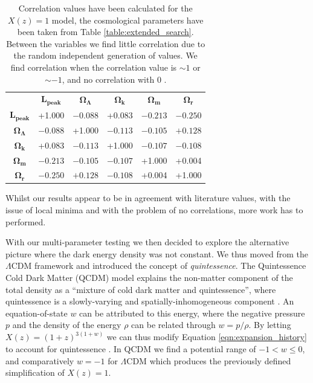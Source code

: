 \documentclass[twocolumn]{revtex4}
\begin{document}
{{{\renewcommand{\arraystretch}{1.2}%
\begin{table}[h!]
\centering
\begin{tabular}{c@{\hskip 10pt}c@{\hskip 10pt}c@{\hskip 10pt}c@{\hskip 10pt}c@{\hskip 10pt}c} 
 \hline
  & \textbf{$\boldsymbol{L_\text{peak}}$} & \textbf{$\boldsymbol{\Omega_\Lambda}$} & \textbf{$\boldsymbol{\Omega_k}$} & \textbf{$\boldsymbol{\Omega_m}$} & \textbf{$\boldsymbol{\Omega_r}$} \\ [0.5ex] 
 \textbf{$\boldsymbol{L_\text{peak}}$} & +1.000 & $-0.088$ & +0.083 & $-0.213$ & $-0.250$ \\
 \textbf{$\boldsymbol{\Omega_\Lambda}$} & $-0.088$ & +1.000 & $-0.113$ & $-0.105$ & $+0.128$ \\
 \textbf{$\boldsymbol{\Omega_k}$} & +0.083 & $-0.113$ & +1.000 & $-0.107$ & $-0.108$ \\
 \textbf{$\boldsymbol{\Omega_m}$} & $-0.213$ & $-0.105$ & $-0.107$ & +1.000 & +0.004 \\
 \textbf{$\boldsymbol{\Omega_r}$} & $-0.250$ & $+0.128$  & $-0.108$ & +0.004 & +1.000\\
 \hline
\end{tabular}
\caption{Correlation values have been calculated for the $X(z)=1$ model, the cosmological parameters have been taken from Table \ref{table:extended_search}. Between the variables we find little correlation due to the random independent generation of values. We find correlation when the correlation value is $\sim1$ or $\sim -1$, and no correlation with $0$ \cite{hugheshase}.}
\vspace{-0.5em}
\label{table:correlations}
\end{table}

Whilst our results appear to be in agreement with literature values, with the issue of local minima and with the problem of no correlations, more work has to performed. 

With our multi-parameter testing we then decided to explore the alternative picture where the dark energy density was not constant. We thus moved from the $\Lambda$CDM framework and introduced the concept of \textit{quintessence}. The Quintessence Cold Dark Matter (QCDM) model explains the non-matter component of the total density as a ``mixture of cold dark matter and quintessence'', where quintessence is a slowly-varying and spatially-inhomogeneous component \cite{quintessence}. An equation-of-state $w$ can be attributed to this energy, where the negative pressure $p$ and the density of the energy $\rho$ can be related through $w=p /\rho$. By letting $X(z)=(1+z)^{3(1+w)}$ we can thus modify Equation \ref{eqn:expansion_history} to account for quintessence \cite{cosmo_constraints}. In QCDM we find a potential range of $-1< w \leq 0$, and comparatively $w=-1$ for $\Lambda$CDM \cite{quintessence} which produces the previously defined simplification of $X(z)=1$.

}}}
\end{document}
